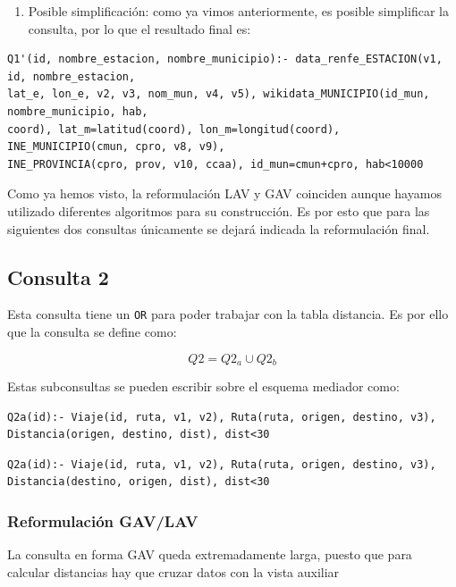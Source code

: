 \begin{enumerate}
\def\labelenumi{\arabic{enumi}.}
\setcounter{enumi}{2}
\tightlist
\item
  Posible simplificación: como ya vimos anteriormente, es posible
  simplificar la consulta, por lo que el resultado final es:
\end{enumerate}

\begin{verbatim}
Q1'(id, nombre_estacion, nombre_municipio):- data_renfe_ESTACION(v1, id, nombre_estacion, 
lat_e, lon_e, v2, v3, nom_mun, v4, v5), wikidata_MUNICIPIO(id_mun, nombre_municipio, hab, 
coord), lat_m=latitud(coord), lon_m=longitud(coord), INE_MUNICIPIO(cmun, cpro, v8, v9),
INE_PROVINCIA(cpro, prov, v10, ccaa), id_mun=cmun+cpro, hab<10000
\end{verbatim}

Como ya hemos visto, la reformulación LAV y GAV coinciden aunque hayamos
utilizado diferentes algoritmos para su construcción. Es por esto que
para las siguientes dos consultas únicamente se dejará indicada la
reformulación final.

\subsection{Consulta 2}\label{consulta-2}

Esta consulta tiene un \texttt{OR} para poder trabajar con la tabla
distancia. Es por ello que la consulta se define como:

\[
Q2=Q2_a\cup Q2_b
\]

Estas subconsultas se pueden escribir sobre el esquema mediador como:

\begin{verbatim}
Q2a(id):- Viaje(id, ruta, v1, v2), Ruta(ruta, origen, destino, v3), 
Distancia(origen, destino, dist), dist<30
\end{verbatim}

\begin{verbatim}
Q2a(id):- Viaje(id, ruta, v1, v2), Ruta(ruta, origen, destino, v3), 
Distancia(destino, origen, dist), dist<30
\end{verbatim}

\subsubsection{Reformulación GAV/LAV}\label{reformulaciuxf3n-gavlav}

La consulta en forma GAV queda extremadamente larga, puesto que para
calcular distancias hay que cruzar datos con la vista auxiliar

